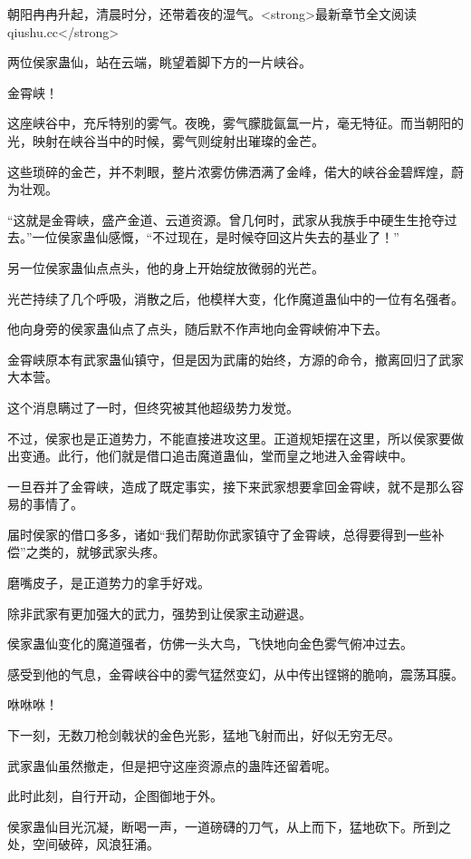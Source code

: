 
\begin{this_body}

朝阳冉冉升起，清晨时分，还带着夜的湿气。<strong>最新章节全文阅读qiushu.cc</strong>

两位侯家蛊仙，站在云端，眺望着脚下方的一片峡谷。

金霄峡！

这座峡谷中，充斥特别的雾气。夜晚，雾气朦胧氤氲一片，毫无特征。而当朝阳的光，映射在峡谷当中的时候，雾气则绽射出璀璨的金芒。

这些琐碎的金芒，并不刺眼，整片浓雾仿佛洒满了金峰，偌大的峡谷金碧辉煌，蔚为壮观。

“这就是金霄峡，盛产金道、云道资源。曾几何时，武家从我族手中硬生生抢夺过去。”一位侯家蛊仙感慨，“不过现在，是时候夺回这片失去的基业了！”

另一位侯家蛊仙点点头，他的身上开始绽放微弱的光芒。

光芒持续了几个呼吸，消散之后，他模样大变，化作魔道蛊仙中的一位有名强者。

他向身旁的侯家蛊仙点了点头，随后默不作声地向金霄峡俯冲下去。

金霄峡原本有武家蛊仙镇守，但是因为武庸的始终，方源的命令，撤离回归了武家大本营。

这个消息瞒过了一时，但终究被其他超级势力发觉。

不过，侯家也是正道势力，不能直接进攻这里。正道规矩摆在这里，所以侯家要做出变通。此行，他们就是借口追击魔道蛊仙，堂而皇之地进入金霄峡中。

一旦吞并了金霄峡，造成了既定事实，接下来武家想要拿回金霄峡，就不是那么容易的事情了。

届时侯家的借口多多，诸如“我们帮助你武家镇守了金霄峡，总得要得到一些补偿”之类的，就够武家头疼。

磨嘴皮子，是正道势力的拿手好戏。

除非武家有更加强大的武力，强势到让侯家主动避退。

侯家蛊仙变化的魔道强者，仿佛一头大鸟，飞快地向金色雾气俯冲过去。

感受到他的气息，金霄峡谷中的雾气猛然变幻，从中传出铿锵的脆响，震荡耳膜。

咻咻咻！

下一刻，无数刀枪剑戟状的金色光影，猛地飞射而出，好似无穷无尽。

武家蛊仙虽然撤走，但是把守这座资源点的蛊阵还留着呢。

此时此刻，自行开动，企图御地于外。

侯家蛊仙目光沉凝，断喝一声，一道磅礴的刀气，从上而下，猛地砍下。所到之处，空间破碎，风浪狂涌。


\end{this_body}
